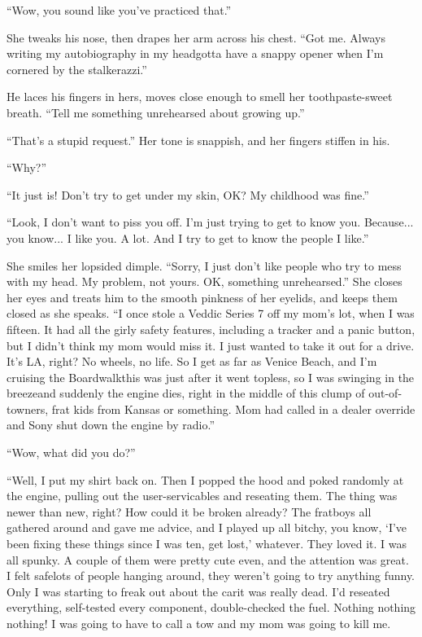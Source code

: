 “Wow, you sound like you’ve practiced that.”

She tweaks his nose, then drapes her arm across his chest. “Got me.
Always writing my autobiography in my head{\dash}gotta have a snappy
opener when I’m cornered by the stalkerazzi.”

He laces his fingers in hers, moves close enough to smell her
toothpaste-sweet breath. “Tell me something unrehearsed about
growing up.”

“That’s a stupid request.” Her tone is snappish, and her fingers
stiffen in his.

“Why?”

“It just is! Don’t try to get under my skin, OK? My childhood was
fine.”

“Look, I don’t want to piss you off. I’m just trying to get to know
you. Because... you know... I like you. A lot. And I try to get to
know the people I like.”

She smiles her lopsided dimple. “Sorry, I just don’t like people
who try to mess with my head. My problem, not yours. OK, something
unrehearsed.” She closes her eyes and treats him to the smooth
pinkness of her eyelids, and keeps them closed as she speaks. “I
once stole a Veddic Series 7 off my mom’s lot, when I was fifteen.
It had all the girly safety features, including a tracker and a
panic button, but I didn’t think my mom would miss it. I just
wanted to take it out for a drive. It’s LA, right? No wheels, no
life. So I get as far as Venice Beach, and I’m cruising the
Boardwalk{\dash}this was just after it went topless, so I was swinging in
the breeze{\dash}and suddenly the engine dies, right in the middle of
this clump of out-of-towners, frat kids from Kansas or something.
Mom had called in a dealer override and Sony shut down the engine
by radio.”

“Wow, what did you do?”

“Well, I put my shirt back on. Then I popped the hood and poked
randomly at the engine, pulling out the user-servicables and
reseating them. The thing was newer than new, right? How could it
be broken already? The fratboys all gathered around and gave me
advice, and I played up all bitchy, you know, ‘I’ve been fixing
these things since I was ten, get lost,’ whatever. They loved it. I
was all spunky. A couple of them were pretty cute even, and the
attention was great. I felt safe{\dash}lots of people hanging around,
they weren’t going to try anything funny. Only I was starting to
freak out about the car{\dash}it was really dead. I’d reseated
everything, self-tested every component, double-checked the fuel.
Nothing nothing nothing! I was going to have to call a tow and my
mom was going to kill me.

